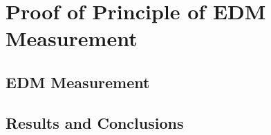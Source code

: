 \documentclass[./Thesis]{subfiles}
\begin{document}
\chapter{Proof of Principle of EDM Measurement}

\section{EDM Measurement}

\section{Results and Conclusions}
\end{document}
